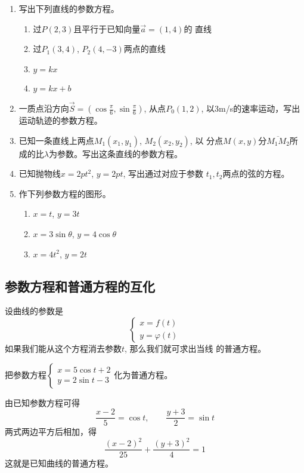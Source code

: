 \begin{ex}
\begin{enumerate}
    \item 写出下列直线的参数方程。
\begin{enumerate}
    \item 过$P(2,3)$且平行于已知向量$\vec{a}=(1,4)$的
    直线
    \item 过$P_1(3,4)$, $P_2(4,-3)$两点的直线
    \item $y=kx$
    \item $y=kx+b$
\end{enumerate}
\item 一质点沿方向$\vec{S}=\left(\cos\frac{\pi}{6},\sin\frac{\pi}{6}\right)$, 
从点$P_0(1,2)$, 
以3m/s的速率运动，写出运动轨迹的参数方程。
\item 已知一条直线上两点$M_1(x_1,y_1)$, $M_2(x_2,y_2)$, 以
分点$M(x,y)$分$\overline{M_1M_2}$所成的比$\lambda$为参数。写出这条直线的参数方程。
\item 已知抛物线$x=2pt^2$, $y=2pt$, 写出通过对应于参数
$t_1,t_2$两点的弦的方程。
\item 作下列参数方程的图形。
\begin{enumerate}
\item $x=t$, $y=3t$
\item $x=3\sin\theta$, $y=4\cos\theta$
\item $x=4t^2$, $y=2t$
\end{enumerate}
\end{enumerate}
\end{ex}

\subsection{参数方程和普通方程的互化}
设曲线的参数是
\[\begin{cases}
   x=f(t)\\
y=\varphi(t) 
\end{cases}\]
如果我们能从这个方程消去参数$t$, 那么我们就可求出当线
的普通方程。
 
\begin{example}
    把参数方程$\begin{cases}
        x=5\cos t+2\\
y=2\sin t-3
    \end{cases}$化为普通方程。
\end{example}

\begin{solution}
    由已知参数方程可得
\[\frac{x-2}{5}=\cos t,\qquad \frac{y+3}{2}=\sin t\]
两式两边平方后相加，得
\[\frac{(x-2)^2}{25}+\frac{(y+3)^2}{4}=1\]
这就是已知曲线的普通方程。
\end{solution}

